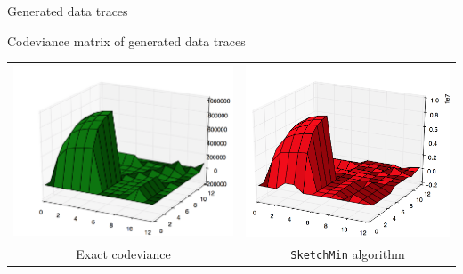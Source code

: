 \documentclass[mathserif]{beamer}
\begin{document}
	\begin{frame}{Generated data traces}
	
	\begin{center}
		\begin{block}{Codeviance matrix of generated data traces}
		\end{block}
		\begin{tabular}{cc}
			\includegraphics[scale=0.16]{generated_real.png} &
			\includegraphics[scale=0.16]{generated_sk.png} \\
			Exact codeviance & \texttt{SketchMin} algorithm \\
		\end{tabular}
	\end{center}
		
	\end{frame}
\end{document}
